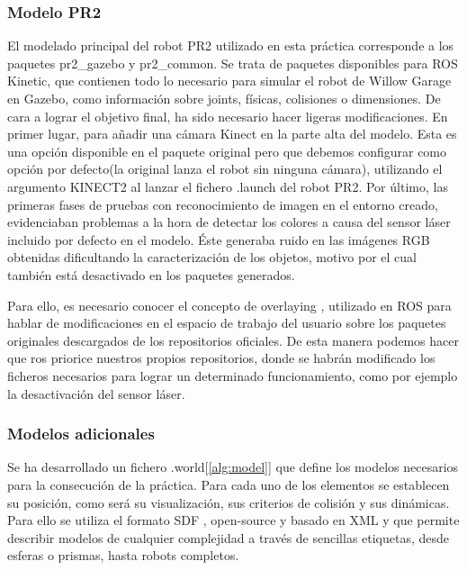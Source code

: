\documentclass[12pt,spanish,chapterprefix, numbers=noenddot]{book}
\numberwithin{equation}{section}
\numberwithin{figure}{section}
\begin{document}
\subsubsection{Modelo PR2}
El modelado principal del robot PR2 utilizado en esta práctica corresponde a los paquetes pr2\_gazebo y pr2\_common. Se trata de paquetes disponibles para ROS Kinetic, que contienen todo lo necesario para simular el robot de Willow Garage en Gazebo, como  información sobre joints, físicas, colisiones o dimensiones. De cara a lograr el objetivo final, ha sido necesario hacer ligeras modificaciones. 
En primer lugar, para añadir una cámara Kinect \cite{gazebo_plugins} en la parte alta del modelo. Esta es una opción disponible en el paquete original pero que debemos configurar como opción por defecto(la original lanza el robot sin ninguna cámara), utilizando el argumento KINECT2 al lanzar el fichero .launch del robot PR2. 
Por último, las primeras fases de pruebas con reconocimiento de imagen en el entorno creado, evidenciaban problemas a la hora de detectar los colores a causa del sensor láser incluido por defecto en el modelo. Éste generaba ruido en las imágenes RGB obtenidas dificultando la caracterización de los objetos, motivo por el cual también está desactivado en los paquetes generados.    

Para ello, es necesario conocer el concepto de overlaying \cite{overlaying}, utilizado en ROS para hablar de modificaciones en el espacio de trabajo \cite{wstool} del usuario sobre los paquetes originales descargados de los repositorios oficiales. De esta manera podemos hacer que ros priorice nuestros propios repositorios, donde se habrán modificado los ficheros necesarios para lograr un determinado funcionamiento, como por ejemplo la desactivación del sensor láser.

\subsubsection{Modelos adicionales}
Se ha desarrollado un fichero .world[\ref{alg:model}] que define los modelos necesarios para la consecución de la práctica. Para cada uno de los elementos se establecen su posición, como será su visualización, sus criterios de colisión y sus dinámicas. 
Para ello se utiliza el formato SDF \cite{sdf_format}, open-source y basado en XML y que permite describir modelos de cualquier complejidad a través de sencillas etiquetas, desde esferas o prismas, hasta robots completos.
\end{document}

